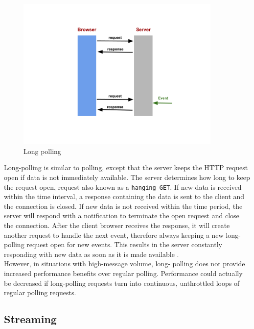 \begin{figure}[H]
\centering
\includegraphics[width=0.9\textwidth]{./Figures/long_polling.png}
\caption[Long polling]{Long polling}
\label{fig:long_polling}
\end{figure}

Long-polling is similar to polling, except that the server keeps the HTTP
request open if data is not immediately available. The server determines how
long to keep the request open, request also known as a \texttt{hanging GET}. If
new data is received within the time interval, a response containing the data
is sent to the client and the connection is closed. If new data is not received
within the time period, the server will respond with a notification to
terminate the open request and close the connection. After the client browser
receives the response, it will create another  request to handle the next
event, therefore always keeping a new long-polling request open for new events.
This results in the server constantly responding with new data as soon as it is
made available \citep{Reference2}.\\

However, in situations with high-message volume, long- polling does not provide
increased performance benefits over regular polling. Performance could actually
be decreased if long-polling requests turn into continuous, unthrottled loops
of regular polling requests.\\


\subsection{Streaming}

